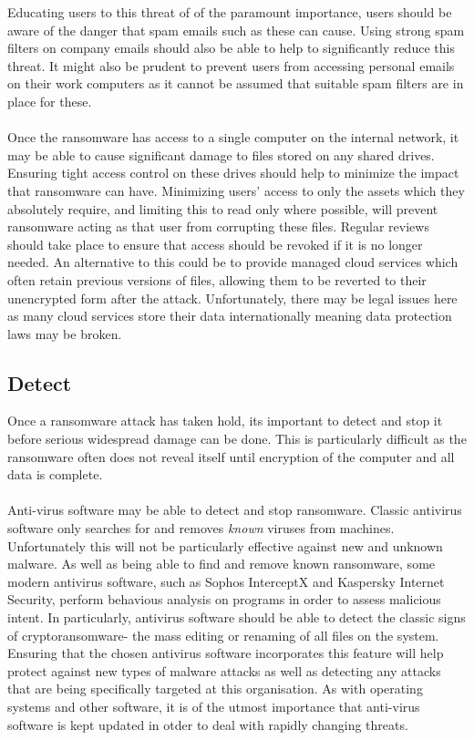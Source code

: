 \documentclass{article}
\begin{document}
Educating users to this threat of of the paramount importance, users should be aware of the danger that spam emails such as these can cause.
Using strong spam filters on company emails should also be able to help to significantly reduce this threat. It might also be prudent to prevent users from accessing personal emails on their work computers as it cannot be assumed that suitable spam filters are in place for these.
\\\\
Once the ransomware has access to a single computer on the internal network, it may be able to cause significant damage to files stored on any shared drives.
Ensuring tight access control on these drives should help to minimize the impact that ransomware can have. Minimizing users' access to only the assets which they absolutely require, and limiting this to read only where possible, will prevent ransomware acting as that user from corrupting these files.
Regular reviews should take place to ensure that access should be revoked if it is no longer needed.
An alternative to this could be to provide managed cloud services which often retain previous versions of files, allowing them to be reverted to their unencrypted form after the attack. Unfortunately, there may be legal issues here as many cloud services store their data internationally meaning data protection laws may be broken.

\subsection{Detect}
Once a ransomware attack has taken hold, its important to detect and stop it before serious widespread damage can be done. This is particularly difficult as the ransomware often does not reveal itself until encryption of the computer and all data is complete.
\\\\
Anti-virus software may be able to detect and stop ransomware. Classic antivirus software only searches for and removes \textit{known} viruses from machines. Unfortunately this will not be particularly effective against new and unknown malware.
As well as being able to find and remove known ransomware, some modern antivirus software, such as Sophos InterceptX and Kaspersky Internet Security, perform behavious analysis on programs in order to assess malicious intent.
In particularly, antivirus software should be able to detect the classic signs of cryptoransomware- the mass editing or renaming of all files on the system.
Ensuring that the chosen antivirus software incorporates this feature will help protect against new types of malware attacks as well as detecting any attacks that are being specifically targeted at this organisation. As with operating systems and other software, it is of the utmost importance that anti-virus software is kept updated in otder to deal with rapidly changing threats.
\end{document}
